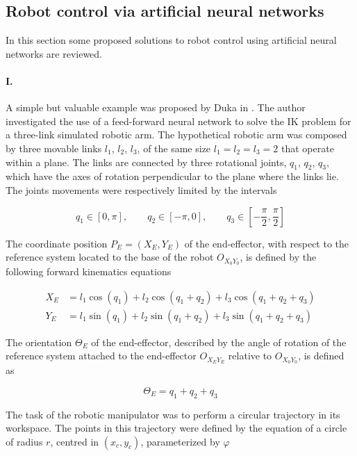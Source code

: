 \documentclass[10pt,a4paper, final]{report} %
\begin{document}
\subsection{Robot control via artificial neural networks}
In this section some proposed solutions to robot control using artificial neural networks are reviewed.

\paragraph{I.}
A simple but valuable example was proposed by Duka in \cite{duka2014neural}. The author investigated the use of a feed-forward neural network to solve the IK problem for a three-link simulated robotic arm. 
The hypothetical robotic arm was composed by three movable links $l_1$, $l_2$, $l_3$, of the same size $l_1 = l_2 = l_3 = 2$ that operate within a plane. The links are connected by three rotational joints, $q_1$, $q_2$, $q_3$, which have the axes of rotation perpendicular to the plane where the links lie. The joints movements were respectively limited by the intervals 

\begin{equation}
q_1 \in [0, \pi], \qquad q_2 \in [-\pi, 0], \qquad q_3 \in [-\frac{\pi}{2}, \frac{\pi}{2}]
\label{eq:duka_joint_values}
\end{equation}


The coordinate position $P_E = (X_E, Y_E)$ of the end-effector, with respect to the reference system located to the base of the robot $O_{X_0 Y_0}$, is defined by the following forward kinematics equations

\begin{align}
X_E &= l_1 \cos(q_1) + l_2 \cos(q_1 + q_2) + l_3 \cos(q_1 + q_2 + q_3)\label{eq:duka_forward_kinematics}\\
Y_E &= l_1 \sin(q_1) + l_2 \sin(q_1 + q_2) + l_3 \sin(q_1 + q_2 + q_3)\nonumber
\end{align}

The orientation $\Theta_E$ of the end-effector, described by the angle of rotation of the reference system attached to the end-effector $O_{X_E Y_E}$ relative to $O_{X_0 Y_0}$, is defined as 

\begin{equation}
\Theta_E = q_1 + q_2 + q_3
\end{equation}

The task of the robotic manipulator was to perform a circular trajectory in its workspace. The points in this trajectory were defined by the equation of a circle of radius $r$,  centred in $(x_c, y_c)$, parameterized by $\varphi$
\end{document}
